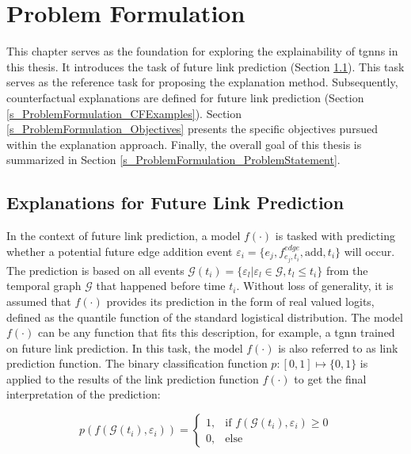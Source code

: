 \section{Problem Formulation}
\label{s_ProblemFormulation}

This chapter serves as the foundation for exploring the explainability of \glspl{tgnn} in this thesis. It introduces the task of future link prediction (Section \ref{s_ProblemFormulation_Task}). This task serves as the reference task for proposing the explanation method. Subsequently, counterfactual explanations are defined for future link prediction (Section \ref{s_ProblemFormulation_CFExamples}). Section \ref{s_ProblemFormulation_Objectives} presents the specific objectives pursued within the explanation approach. Finally, the overall goal of this thesis is summarized in Section \ref{s_ProblemFormulation_ProblemStatement}.

\subsection{Explanations for Future Link Prediction}
\label{s_ProblemFormulation_Task}
In the context of future link prediction, a model $f(\cdot)$ is tasked with predicting whether a potential future edge addition event $\varepsilon_{i} = \{e_j, f_{e_j, t_i}^{edge}, \mathrm{add}, t_i\}$ will occur. The prediction is based on all events $\mathcal{G}(t_i) = \{\varepsilon_{l} | \varepsilon_{l} \in \mathcal{G}, t_l \leq t_i\}$ from the temporal graph $\mathcal{G}$ that happened before time $t_i$. Without loss of generality, it is assumed that $f(\cdot)$ provides its prediction in the form of real valued logits, defined as the quantile function of the standard logistical distribution. The model $f(\cdot)$ can be any function that fits this description, for example, a \gls{tgnn} trained on future link prediction. In this task, the model $f(\cdot)$ is also referred to as link prediction function. The binary classification function $p: [0, 1] \mapsto \{0, 1\}$ is applied to the results of the link prediction function $f(\cdot)$ to get the final interpretation of the prediction:

\begin{equation}
    p(f(\mathcal{G}(t_i), \varepsilon_{i})) = 
    \begin{cases}
    1,  &\text{if } f(\mathcal{G}(t_i), \varepsilon_{i}) \geq 0 \\
    0,  &\text{else}
    \end{cases}
\end{equation}

